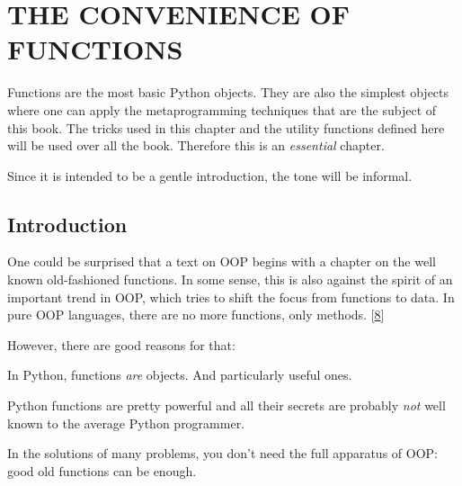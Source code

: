 \documentclass[10pt,english]{article}
\begin{document}

\hypertarget{the-convenience-of-functions}{}
\section*{THE CONVENIENCE OF FUNCTIONS}

Functions are the most basic Python objects. They are also the simplest
objects where one can apply the  metaprogramming techniques that are
the subject of this book. The tricks used in this chapter and the utility
functions defined here will be used over all the book. Therefore this
is an \emph{essential} chapter.

Since it is intended to be a gentle introduction, the tone will be
informal.



\hypertarget{id16}{}
\subsection*{Introduction}

One could be surprised that a text on OOP begins with a chapter on the
well known old-fashioned functions. In some sense, this is also
against the spirit of an important trend in OOP, which tries to
shift the focus from functions to data. In pure OOP languages,
there are no more functions, only methods. [\hyperlink{id15}{8}]

However, there are good reasons for that:
\begin{list}{.}
{
\setlength{\rightmargin}{\leftmargin}
}
\item {} 
In Python,  functions  \emph{are} objects. And particularly useful ones.

\item {} 
Python functions are pretty powerful and all their secrets are probably
\emph{not} well known to the average Python programmer.

\item {} 
In the solutions of many problems, you don't need the full apparatus
of OOP: good old functions can be enough.

\end{list}
\end{document}
